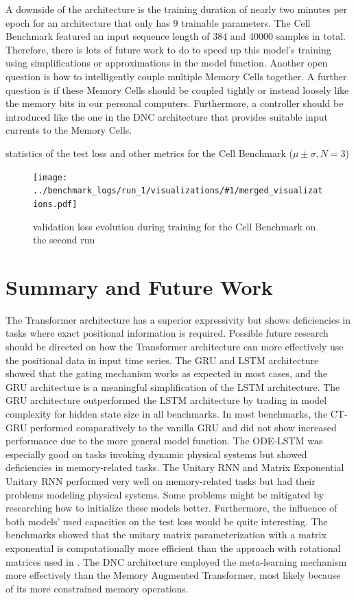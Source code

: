 \documentclass[draft,final]{vutinfth} %
\newcommand{\benchmarksummary}[2]{
    \begin{table}
        \centering{}
        \resizebox{\linewidth}{!}{\csvautotabular[options]{../benchmark_logs/statistics/#1.csv}}
        \caption{statistics of the test loss and other metrics for the #2 Benchmark ($\mu \pm \sigma, N=3$)}
        \label{tab:test_loss_#1}
    \end{table}
    \begin{figure}[h]
        \centering{}
        \texttt{[image: ../benchmark\_logs/run\_1/visualizations/\#1/merged\_visualizations.pdf]}
        \caption{validation loss evolution during training for the #2 Benchmark on the second run}
        \label{fig:validation_loss_#1}
    \end{figure}
    \clearpage{}
}
\begin{document}
    A downside of the architecture is the training duration of nearly two minutes per epoch for an architecture that only has $9$ trainable parameters.
    The Cell Benchmark featured an input sequence length of $384$ and $40000$ samples in total.
    Therefore, there is lots of future work to do to speed up this model's training using simplifications or approximations in the model function.
    Another open question is how to intelligently couple multiple Memory Cells together. A further question is if these Memory Cells should be coupled tightly or instead loosely like the memory bits in our personal computers.
    Furthermore, a controller should be introduced like the one in the DNC architecture that provides suitable input currents to the Memory Cells.
    \benchmarksummary{cell}{Cell}


    \chapter{Summary and Future Work}
    The Transformer architecture has a superior expressivity but shows deficiencies in tasks where exact positional information is required.
    Possible future research should be directed on how the Transformer architecture can more effectively use the positional data in input time series.
    The GRU and LSTM architecture showed that the gating mechanism works as expected in most cases, and the GRU architecture is a meaningful simplification of the LSTM architecture.
    The GRU architecture outperformed the LSTM architecture by trading in model complexity for hidden state size in all benchmarks.
    In most benchmarks, the CT-GRU performed comparatively to the vanilla GRU and did not show increased performance due to the more general model function.
    The ODE-LSTM was especially good on tasks invoking dynamic physical systems but showed deficiencies in memory-related tasks.
    The Unitary RNN and Matrix Exponential Unitary RNN performed very well on memory-related tasks but had their problems modeling physical systems.
    Some problems might be mitigated by researching how to initialize these models better.
    Furthermore, the influence of both models' used capacities on the test loss would be quite interesting.
    The benchmarks showed that the unitary matrix parameterization with a matrix exponential is computationally more efficient than the approach with rotational matrices used in \cite{EfficientUnitaryRNNs}.
    The DNC architecture employed the meta-learning mechanism more effectively than the Memory Augmented Transformer, most likely because of its more constrained memory operations.
\end{document}
